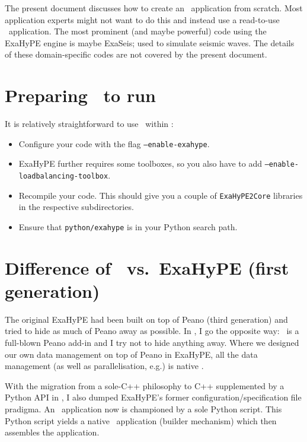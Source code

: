 The present document discusses how to create an \ExaHyPE\ application from
scratch.
Most application experts might not want to do this and instead use a read-to-use
\ExaHyPE\ application.
The most prominent (and maybe powerful) code using the ExaHyPE engine is maybe
ExaSeis; used to simulate seismic waves.
The details of these domain-specific codes are not covered by the present
document.



\section*{Preparing \Peano\ to run \ExaHyPE}

It is relatively straightforward to use \ExaHyPE\ within \Peano:

\begin{itemize}
  \item Configure your code with the flag \texttt{--enable-exahype}.
  \item ExaHyPE further requires some toolboxes, so you also have to add
  \texttt{--enable-loadbalancing-toolbox}.
  \item Recompile your code. This should give you a couple of
  \texttt{ExaHyPE2Core} libraries in the respective subdirectories.
  \item Ensure that \texttt{python/exahype} is in your Python search path.
\end{itemize}


\section*{Difference of \ExaHyPE\ vs.~ExaHyPE (first generation)}

The original ExaHyPE had been built on top of Peano (third generation) and tried
to hide as much of Peano away as possible.
In \ExaHyPE, I go the opposite way: \ExaHyPE\ is a full-blown Peano add-in and I
try not to hide anything away.
Where we designed our own data management on top of Peano in ExaHyPE, all the
data management (as well as parallelisation, e.g.) is native \Peano.


With the migration from a sole-C++ philosophy to C++ supplemented by a Python
API in \Peano, I also dumped ExaHyPE's former configuration/specification file
pradigma.
An \ExaHyPE\ application now is championed by a sole Python script.
This Python script yields a native \Peano\ application (builder mechanism) which
then assembles the application.



